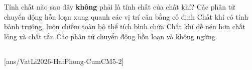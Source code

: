 	\begin{ex}%
		Tính chất nào sau đây \textbf{không} phải là tính chất của chất khí?
		\choice
		{\True Các phân tử chuyển động hỗn loạn xung quanh các vị trí cân bằng cố định}
		{Chất khí có tính bành trướng, luôn chiếm toàn bộ thể tích bình chứa}
		{Chất khí dễ nén hơn chất lỏng và chất rắn}
		{Các phân tử chuyển động hỗn loạn và không ngừng}
	\end{ex}

	\subsection*{}
	\setcounter{ex}{0}
	[ans/VatLi2026-HaiPhong-CumCM5-2]

